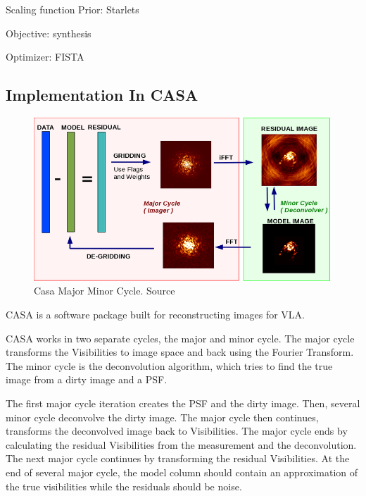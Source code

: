 Scaling function
Prior: Starlets

Objective: synthesis


Optimizer: FISTA

\pagebreak
\subsection{Implementation In CASA}

\begin{figure}
	\centering
	\vspace{-15pt}
	\includegraphics[width=0.9\linewidth]{./chapters/04.cs/img/casa_major_minor.png}
	\caption{Casa Major Minor Cycle. Source \cite{casa2018major}}
	\label{cs:major}
	\vspace{-10pt}
\end{figure}

CASA is a software package built for reconstructing images for VLA. 

CASA works in two separate cycles, the major and minor cycle. The major cycle transforms the Visibilities to image space and back using the Fourier Transform. The minor cycle is the deconvolution algorithm, which tries to find the true image from a dirty image and a PSF. 

The first major cycle iteration creates the PSF and the dirty image. Then, several minor cycle deconvolve the dirty image. The major cycle then continues, transforms the deconvolved image back to Visibilities. The major cycle ends by calculating the residual Visibilities from the measurement and the deconvolution. The next major cycle continues by transforming the residual Visibilities. At the end of several major cycle, the model column should contain an approximation of the true visibilities while the residuals should be noise. %

